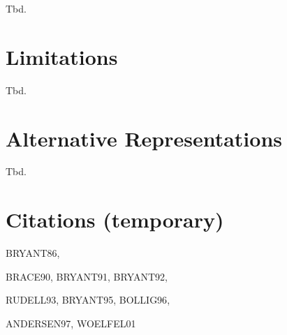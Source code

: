 \documentclass{vldb}
\begin{document}
Tbd.

\section{Limitations}
\label{sec:limitations}

Tbd.

\section{Alternative Representations}
\label{sec:alternative-representations}

Tbd.

\section{Citations (temporary)}

\noindent
\par
BRYANT86\cite{BRYANT86},
\par
BRACE90\cite{BRACE90}, BRYANT91\cite{BRYANT91}, BRYANT92\cite{BRYANT92},
\par
RUDELL93\cite{RUDELL93}, BRYANT95\cite{BRYANT95}, BOLLIG96\cite{BOLLIG96},
\par
ANDERSEN97\cite{ANDERSEN97}, WOELFEL01\cite{WOELFEL01}


\balance



\end{document}
